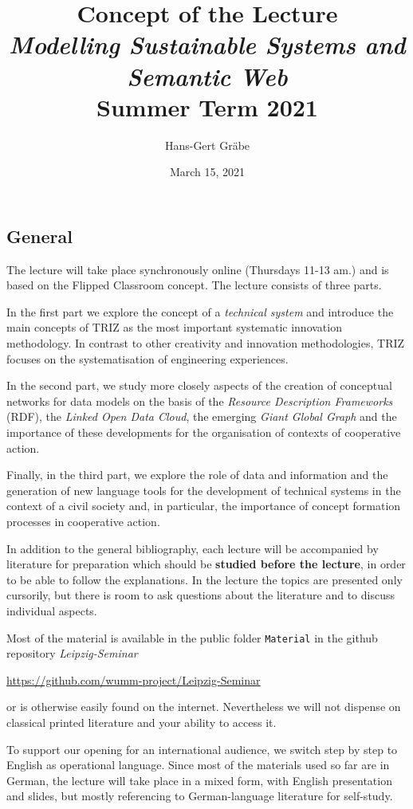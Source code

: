 \documentclass[11pt,a4paper]{article}
\title{Concept of the Lecture \\[1em] \emph{Modelling Sustainable Systems and
    Semantic Web} \\[1em] Summer Term 2021}
\author{Hans-Gert Gr\"abe}
\date{March 15, 2021}
\begin{document}
\maketitle

\subsection{General}

The lecture will take place synchronously online (Thursdays 11-13 am.) and is
based on the Flipped Classroom concept. The lecture consists of three parts.

In the first part we explore the concept of a \emph{technical system} and
introduce the main concepts of TRIZ as the most important systematic
innovation methodology.  In contrast to other creativity and innovation
methodologies, TRIZ focuses on the systematisation of engineering experiences.

In the second part, we study more closely aspects of the creation of
conceptual networks for data models on the basis of the \emph{Resource
  Description Frameworks} (RDF), the \emph{Linked Open Data Cloud}, the
emerging \emph{Giant Global Graph} and the importance of these developments
for the organisation of contexts of cooperative action.

Finally, in the third part, we explore the role of data and information and
the generation of new language tools for the development of technical systems
in the context of a civil society and, in particular, the importance of
concept formation processes in cooperative action.

In addition to the general bibliography, each lecture will be accompanied by
literature for preparation which should be \textbf{studied before the
  lecture}, in order to be able to follow the explanations. In the lecture the
topics are presented only cursorily, but there is room to ask questions about
the literature and to discuss individual aspects.

Most of the material is available in the public folder \texttt{Material} in
the github repository \emph{Leipzig-Seminar}
\begin{center}
  \url{https://github.com/wumm-project/Leipzig-Seminar}
\end{center}
or is otherwise easily found on the internet. Nevertheless we will not
dispense on classical printed literature and your ability to access it.

To support our opening for an international audience, we switch step by step
to English as operational language. Since most of the materials used so far
are in German, the lecture will take place in a mixed form, with English
presentation and slides, but mostly referencing to German-language literature
for self-study.
\end{document}
